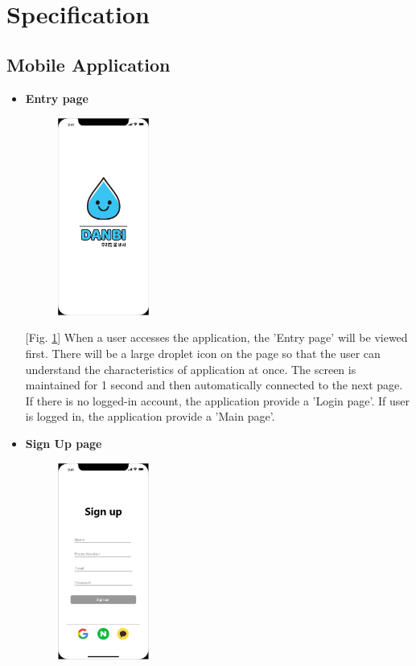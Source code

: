 \documentclass[conference]{IEEEtran}
\begin{document}
\ 

\section{Specification}

\subsection{Mobile Application}\label{AA}
\begin{itemize}
\setlength{\parindent}{2ex}
\setlength{\parskip}{0.5em}
\item \textbf{Entry page}

\par \begin{figure}[h!]
\includegraphics[width=3cm]{xd/entry page.JPG}
\centering
\caption{}
\label{fig:entry}
\end{figure}

[Fig. \ref{fig:entry}] When a user accesses the application, the 'Entry page' will be viewed first. There will be a large droplet icon on the page so that the user can understand the characteristics of application at once. The screen is maintained for 1 second and then automatically connected to the next page. If there is no logged-in account, the application provide a 'Login page'. If user is logged in, the application provide a 'Main page'.

\item \textbf{Sign Up page}

\par \begin{figure}[h!]
\includegraphics[width=3cm]{xd/sign up page.JPG}
\centering
\caption{}
\label{fig:signup}
\end{figure}


\end{itemize}
\end{document}
